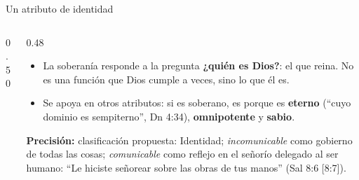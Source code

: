 \documentclass[hyperref={bookmarks=false},aspectratio=169]{beamer}
\newcommand{\destacar}[1]{\textbf{\textcolor{azul}{#1}}}
\newcommand{\precision}[1]{{\footnotesize\color{gris}\textbf{Precisión:} #1}}
\begin{document}
\begin{frame}{Un atributo de identidad}
\begin{columns}[c,onlytextwidth]
\begin{column}{0.50\textwidth}
\centering
{}
\end{column}
\begin{column}{0.48\textwidth}\small
\begin{itemize}
\item La soberanía responde a la pregunta \destacar{¿quién es Dios?}: el que reina. No es una función que Dios cumple a veces, sino lo que él es.
\item Se apoya en otros atributos: si es soberano, es porque es \destacar{eterno} (``cuyo dominio es sempiterno'', Dn 4:34), \destacar{omnipotente} y \destacar{sabio}.
\end{itemize}
\precision{clasificación propuesta: Identidad; \emph{incomunicable} como gobierno de todas las cosas; \emph{comunicable} como reflejo en el señorío delegado al ser humano: ``Le hiciste señorear sobre las obras de tus manos'' (Sal 8:6 [8:7]).}
\end{column}
\end{columns}
\end{frame}
\end{document}
